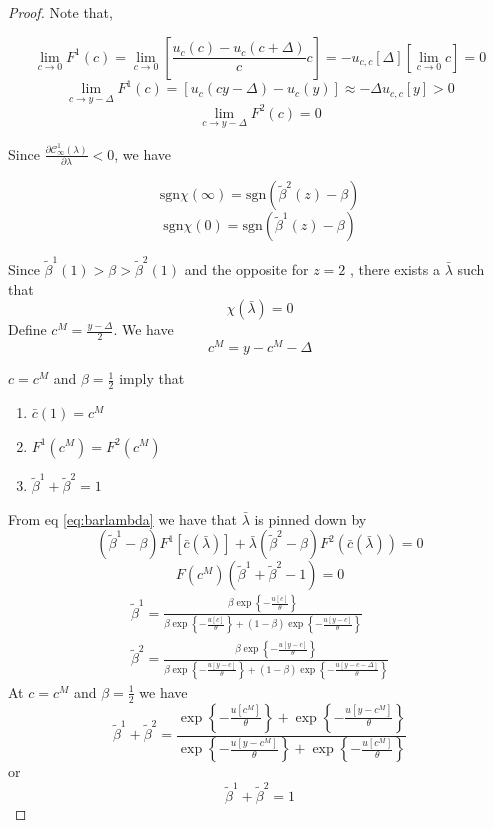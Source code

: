 \documentclass[12pt]{article}
\begin{document}
\begin{proof}
Note that,

\[\lim_{c\to 0} F^1(c) = \lim_{c \to 0}\left[\frac{u_c(c)-u_c(c+\Delta)}{c}c\right] = -u_{c,c}[\Delta] [\lim_{c \to 0} c]=0\]
\[\lim_{c\to y-\Delta} F^1(c) = \left[{u_c(c y-\Delta)-u_c(y)}\right] \approx -\Delta u_{c,c} [y] > 0\]
\[\lim_{c\to y-\Delta} F^2(c) = 0\]


Since $\frac{\partial \mathcal{C}^1_{\infty} (\lambda)}{\partial \lambda} <0 $, we have

\[\text{sgn} \chi(\infty) = \text{sgn} (\tilde{\beta}^2(z)-\beta)\]
\[\text{sgn} \chi(0) = \text{sgn} (\tilde{\beta}^1(z)-\beta)\]

Since $\tilde {\beta} ^1(1) > \beta > \tilde{\beta}^2(1)$ and the opposite for $z=2$ , there exists a $\bar{\lambda}$ such that
\[\chi(\bar{\lambda})=0\]
Define $c^{M}=\frac{y-\Delta}{2}$. We have
\begin{equation}
c^M=y-c^M-\Delta
\nonumber
\end{equation}

$c=c^M$ and $\beta=\frac{1}{2}$ imply that
\begin{enumerate}
	\item $\bar{c}(1)=c^M$ 
	\item $F^1(c^M)=F^2(c^M)$
	\item $\tilde{\beta}^1+\tilde{\beta}^2=1$
\end{enumerate}

From eq \ref{eq:barlambda} we have that $\bar{\lambda}$ is pinned down by
\[
(\tilde{\beta}^1-\beta) F^1[\bar{c}(\bar{\lambda})]+\bar{\lambda}(\tilde{\beta}^2-\beta)F^2(\bar{c}(\bar{\lambda}))=0
\]
\[F(c^M)(\tilde{\beta}^1+\tilde{\beta}^2-1)=0\]
\begin{align*}
\tilde{\beta}^1=\frac{\beta \exp \left\{ -\frac{u[c]}{\theta}\right\}}{\beta \exp \left\{ -\frac{u[c]}{\theta}\right\}+ (1-\beta)\exp \left\{ -\frac{u[y-c]}{\theta}\right\}}\\
\tilde{\beta}^2=\frac{\beta \exp \left\{ -\frac{u[y-c]}{\theta}\right\}}{\beta \exp \left\{ -\frac{u[y-c]}{\theta}\right\}+ (1-\beta)\exp \left\{ -\frac{u[y-c-\Delta]}{\theta}\right\}}
\end{align*}
At $c=c^M$ and $\beta=\frac{1}{2}$ we have
\begin{equation}
\tilde{\beta}^1+\tilde{\beta}^2=\frac{ \exp \left\{ -\frac{u[c^M]}{\theta}\right\}+ \exp \left\{ -\frac{u[y-c^M]}{\theta}\right\}}{ \exp \left\{ -\frac{u[y-c^M]}{\theta}\right\}+ \exp \left\{ -\frac{u[c^M]}{\theta}\right\}}
\end{equation}
or
\[\tilde{\beta}^1+\tilde{\beta}^2=1\]
\end{proof}
\end{document}
